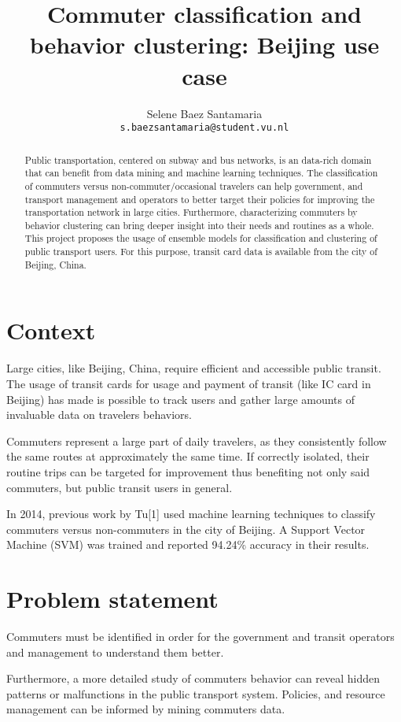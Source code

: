\documentclass{article}
\title{Commuter classification and behavior clustering: Beijing use case}
\author{
  Selene Baez  Santamaria \\
  \texttt{s.baezsantamaria@student.vu.nl}
}
\begin{document}

\maketitle

\begin{abstract}
  Public transportation, centered on subway and bus networks, is an data-rich domain that can benefit from data mining and machine learning techniques. The classification of commuters versus non-commuter/occasional travelers can help government, and transport management and operators to better target their policies for improving the transportation network in large cities. Furthermore, characterizing commuters by behavior clustering can bring deeper insight into their needs and routines as a whole. 
  This project proposes the usage of ensemble models for classification and clustering of public transport users. For this purpose, transit card data is available from the city of Beijing, China. 
\end{abstract}

\section{Context}
Large cities, like Beijing, China, require efficient and accessible public transit. The usage of transit cards for usage and payment of transit (like IC card in Beijing) has made is possible to track users and gather large  amounts of invaluable data on travelers behaviors. 

Commuters represent a large part of daily travelers, as they consistently follow the same routes at approximately the same time. If correctly isolated, their routine trips can be targeted for improvement thus benefiting not only said commuters, but public transit users in general. 

In 2014, previous work by Tu[1] used machine learning techniques to classify commuters versus non-commuters in the city of Beijing. A Support Vector Machine (SVM) was trained and reported 94.24\% accuracy in their results. 

\section{Problem statement}
Commuters must be identified in order for the government and transit operators and management to understand them better. 

Furthermore, a more detailed study of commuters behavior can reveal hidden patterns or malfunctions in the public transport system. Policies, and resource management can be informed by mining commuters data.
\end{document}
